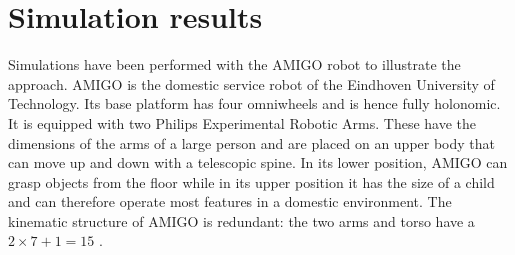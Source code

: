 
\section{Simulation results}\label{wbp:sec:simulations}
Simulations have been performed with the AMIGO robot to illustrate the approach.
AMIGO is the domestic service robot of the Eindhoven University of Technology. Its base platform has four omniwheels and is hence fully holonomic. It is equipped with two  Philips Experimental Robotic Arms. These have the dimensions of the arms of a large person and are placed on an upper body that can move up and down with a telescopic spine. In its lower position, AMIGO can grasp objects from the floor while in its upper position it has the size of a child and can therefore operate most features in a domestic environment. The kinematic structure of AMIGO is redundant: the two arms and torso have a $2 \times 7 +1 = 15$ \dofs.

